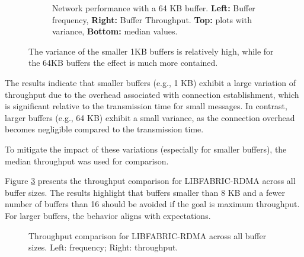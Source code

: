 \begin{figure}[htbp]
\begin{subfigure}[b]{\textwidth}
{    }
    \caption[Network performance with a 64 KB buffer]{Network performance with a 64 KB buffer. \textbf{Left:} Buffer frequency, \textbf{Right:} Buffer Throughput. \textbf{Top:} plots with variance, \textbf{Bottom:} median values.}
    \label{fig:64kb-buffer-throughput}
\end{subfigure}
\caption[Throughput comparison of 1KB and 64KB buffer]{The variance of the smaller 1KB buffers is relatively high, while for the 64KB buffers the effect is much more contained.}
\label{fig:throughput-of-the-extremes-1K-64K}
\end{figure}

The results indicate that smaller buffers (e.g., 1 KB) exhibit a large variation of throughput due to the overhead associated with connection establishment, which is significant relative to the transmission time for small messages. In contrast, larger buffers (e.g., 64 KB) exhibit a small variance, as the connection overhead becomes negligible compared to the transmission time.

To mitigate the impact of these variations (especially for smaller buffers), the median throughput was used for comparison.

Figure \ref{fig:libfabric-mean-throughput-comparison} presents the throughput comparison for LIBFABRIC-RDMA across all buffer sizes. The results highlight that buffers smaller than 8 KB and a fewer number of buffers than 16 should be avoided if the goal is maximum throughput. For larger buffers, the behavior aligns with expectations. 

\begin{figure}[htbp]
\centering
{}
\caption[Throughput comparison for LIBFABRIC-RDMA across all buffer sizes]{Throughput comparison for LIBFABRIC-RDMA across all buffer sizes. Left: frequency; Right: throughput.}
\label{fig:libfabric-mean-throughput-comparison}
\end{figure}

